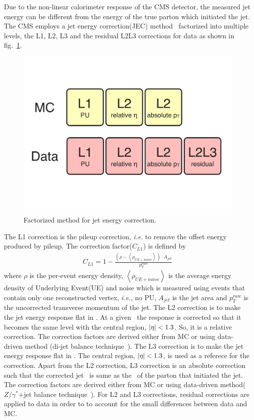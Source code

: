 Due to the non-linear calorimeter response of the CMS detector, 
the measured jet energy can be different from the energy of the true parton which 
initiated the jet. The CMS employs a jet energy correction(JEC) 
method~\cite{Chatrchyan:1369486} factorized into multiple levels, 
the L1, L2, L3 and the residual L2L3 corrections for data as shown in fig.~\ref{fig:jec}. 
\begin{figure}[!hbtp]
\centering
\includegraphics[width=.95\textwidth]{figures/jec.pdf}
\caption{Factorized method for jet energy correction.}
\label{fig:jec}
\end{figure}

The L1 correction is the pileup correction, \textit{i.e.} to remove the offset energy 
produced by pileup. The correction factor($C_{L1}$) is defined by~\cite{Chatrchyan:1369486} 
\begin{eqnarray} 
C_{L1} = 1 - \frac{\left( \rho - \left<\rho_{UE+noise}\right>\right) \cdot A_{jet}}{p_T^{raw}}  \end{eqnarray} 
where $\rho$ is the per-event energy density, 
$\left<\rho_{UE+noise}\right>$ is the average energy density 
of Underlying Event(UE) and noise which is measured using events that contain only one 
reconstructed vertex, \textit{i.e.}, no PU, 
$A_{jet}$ is the jet area
and $p_T^{raw}$ is the uncorrected transverse momentum of the jet. 
The L2 correction is to make the jet energy response flat in \Eta.  
At a given \Eta\, the response is corrected so that it becomes the same level 
with the central region, $|\eta|<1.3$. So, it is a relative correction.  
The correction factors are derived either from MC or using data-driven method
(di-jet balance technique~\cite{Chatrchyan:1369486}).
The L3 correction is to make the jet energy response flat in \pt.  
The central region, $|\eta|<1.3$, is used as a referece for the correction. 
Apart from the L2 correction, L3 correction is an absolute correction 
such that the corrected jet \pt\ is same as the \pt\ of the parton that 
initiated the jet. The correction factors are derived either from MC 
or using data-driven method($Z/\gamma^*$+jet balance technique~\cite{Chatrchyan:1369486}). 
For L2 and L3 corrections, 
residual corrections are applied to data in order to to account for the small differences 
between data and MC. 

